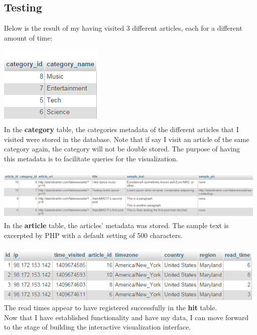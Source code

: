 \documentclass[12pt]{article}
\begin{document}
\subsection{Testing}
Below is the result of my having visited 3 different articles, each for a different amount of time:

\noindent\includegraphics[scale=1]{img/results_categories} \\
\noindent In the \textbf{category} table, the categories metadata of the different articles that I visited were stored in the database. Note that if say I visit an article of the same category again, the category will not be double stored. The purpose of having this metadata is to facilitate queries for the visualization. \\ \\

\noindent\includegraphics[scale=0.6]{img/results_articles}
\noindent In the \textbf{article} table, the articles' metadata was stored. The sample text is excerpted by PHP with a default setting of 500 characters. \\ \\ 

\noindent\includegraphics[scale=1]{img/results_hits} \\
\noindent The read times appear to have registered successfully in the \textbf{hit} table. \\

Now that I have established functionality and have my data, I can move forward to the stage of building the interactive visualization interface.
\end{document}
